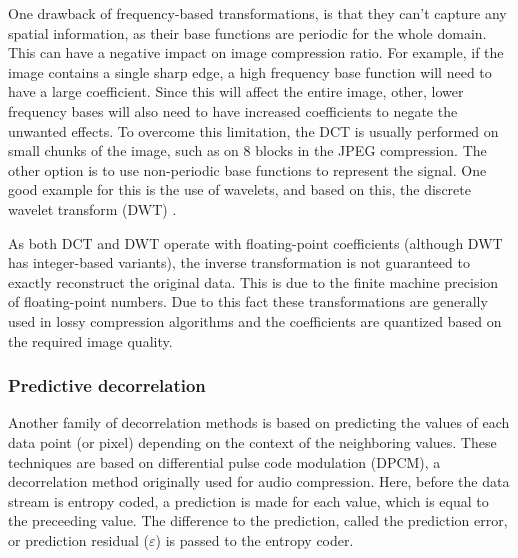       One drawback of frequency-based transformations, is that they can't capture any spatial information, as their base functions are periodic for the whole domain. This can have a negative impact on image compression ratio. For example, if the image contains a single sharp edge, a high frequency base function will need to have a large coefficient. Since this will affect the entire image, other, lower frequency bases will also need to have increased coefficients to negate the unwanted effects.
      To overcome this limitation, the DCT is usually performed on small chunks of the image, such as on 8 blocks in the JPEG compression. The other option is to use non-periodic base functions to represent the signal. One good example for this is the use of wavelets, and based on this, the discrete wavelet transform (DWT) \cite{mallat_theory_1989, jensen_ripples_2001}.

      As both DCT and DWT operate with floating-point coefficients (although DWT has integer-based variants), the inverse transformation is not guaranteed to exactly reconstruct the original data. This is due to the finite machine precision of floating-point numbers. Due to this fact these transformations are generally used in lossy compression algorithms and the coefficients are quantized based on the required image quality.
      
      
  
      \subsubsection{Predictive decorrelation}
      \label{sec:predictors}
      Another family of decorrelation methods is based on predicting the values of each data point (or pixel) depending on the context of the neighboring values. These techniques are based on differential pulse code modulation (DPCM), a decorrelation method originally used for audio compression. Here, before the data stream is entropy coded, a prediction is made for each value, which is equal to the preceeding value. The difference to the prediction, called the prediction error, or prediction residual ($\varepsilon$) is passed to the entropy coder.

